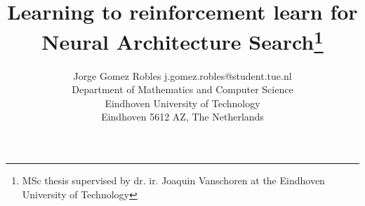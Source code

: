 \documentclass[twoside,11pt]{article}
\begin{document}
\title{Learning to reinforcement learn for Neural Architecture Search\thanks{MSc thesis supervised by dr. ir. Joaquin Vanschoren at the Eindhoven University of Technology}}


\author{\name Jorge Gomez Robles \email j.gomez.robles@student.tue.nl \\
       \addr Department of Mathematics and Computer Science\\
       Eindhoven University of Technology\\
       Eindhoven 5612 AZ, The Netherlands
}


\maketitle













\vskip 0.2in


\newpage
\appendix
% 



\end{document}

